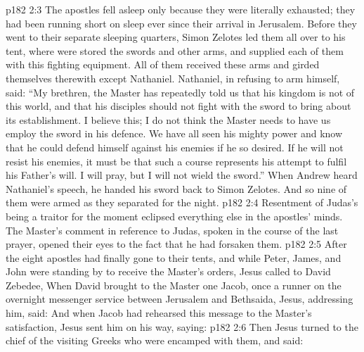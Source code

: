 \vs p182 2:3 The apostles fell asleep only because they were literally exhausted; they had been running short on sleep ever since their arrival in Jerusalem. Before they went to their separate sleeping quarters, Simon Zelotes led them all over to his tent, where were stored the swords and other arms, and supplied each of them with this fighting equipment. All of them received these arms and girded themselves therewith except Nathaniel. Nathaniel, in refusing to arm himself, said: “My brethren, the Master has repeatedly told us that his kingdom is not of this world, and that his disciples should not fight with the sword to bring about its establishment. I believe this; I do not think the Master needs to have us employ the sword in his defence. We have all seen his mighty power and know that he could defend himself against his enemies if he so desired. If he will not resist his enemies, it must be that such a course represents his attempt to fulfil his Father’s will. I will pray, but I will not wield the sword.” When Andrew heard Nathaniel’s speech, he handed his sword back to Simon Zelotes. And so nine of them were armed as they separated for the night.
\vs p182 2:4 Resentment of Judas’s being a traitor for the moment eclipsed everything else in the apostles’ minds. The Master’s comment in reference to Judas, spoken in the course of the last prayer, opened their eyes to the fact that he had forsaken them.
\vs p182 2:5 \pc After the eight apostles had finally gone to their tents, and while Peter, James, and John were standing by to receive the Master’s orders, Jesus called to David Zebedee,  When David brought to the Master one Jacob, once a runner on the overnight messenger service between Jerusalem and Bethsaida, Jesus, addressing him, said:  And when Jacob had rehearsed this message to the Master’s satisfaction, Jesus sent him on his way, saying: 
\vs p182 2:6 Then Jesus turned to the chief of the visiting Greeks who were encamped with them, and said: 
